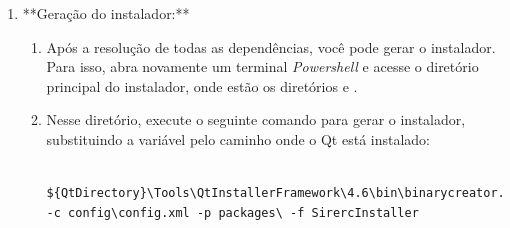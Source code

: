 \documentclass[a4paper,11pt]{article}
\newcommand{\sistema}{\textsf{SIRERC}}
\newcommand{\cautionbox}[1]{
	\vskip 5mm
	\begin{leftbar}
		\textbf{#1}
	\end{leftbar}
	\vskip 5mm
}
\begin{document}
\begin{enumerate}
\begin{enumerate}
		\begin{figure}[H]\centering
			\caption{Dependências do \sistema{} encontradas com a ferramenta \emph{Dependencies}}\label{fig:deptool}
		\end{figure}
		
		\item Copie todas as dependências necessárias para o diretório , incluindo bibliotecas do VTK, por exemplo.
		
		\cautionbox{Este processo deve ser realizado com cautela, pois sem todas as dependências necessárias, o \sistema{} não funcionará corretamente após a instalação.}
	\end{enumerate}
	
	\item **Geração do instalador:**
	\begin{enumerate}
		\item Após a resolução de todas as dependências, você pode gerar o instalador. Para isso, abra novamente um terminal \emph{Powershell} e acesse o diretório principal do instalador, onde estão os diretórios  e .
		\item Nesse diretório, execute o seguinte comando para gerar o instalador, substituindo a variável  pelo caminho onde o Qt está instalado:
		
		\begin{verbatim}
			${QtDirectory}\Tools\QtInstallerFramework\4.6\bin\binarycreator.exe -c config\config.xml -p packages\ -f SirercInstaller
		\end{verbatim}
		

\end{enumerate}
\end{enumerate}
\end{document}

